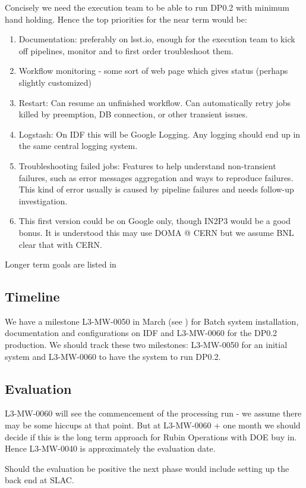 Concisely we need the execution team to be able to run DP0.2 with minimum hand holding.
Hence the top priorities for the near term would be:
\begin{enumerate}
\item Documentation: preferably on lsst.io, enough for the execution team to kick off pipelines,  monitor and to first order troubleshoot them.
\item Workflow monitoring - some sort of web page which gives status (perhaps slightly customized)
\item Restart: Can resume an unfinished workflow. Can automatically retry jobs killed by preemption, DB connection, or other transient issues.
\item Logstash: On IDF this will be Google Logging. Any logging should end up in the same central logging system.
\item Troubleshooting failed jobs: Features to help understand non-transient failures, such as error messages aggregation and ways to reproduce failures. This kind of error usually is caused by pipeline failures and needs follow-up investigation.
\item This first version could be on Google only, though IN2P3 would be a good bonus.  It is understood this may use DOMA @ CERN but we assume BNL clear that with CERN.
\end{enumerate}

Longer term goals are listed in 

\subsection{Timeline}
We have a milestone L3-MW-0050 in March (see ) for Batch system installation, documentation and configurations on IDF and L3-MW-0060 for the DP0.2 production.
We should track these two milestones: L3-MW-0050 for an initial system and L3-MW-0060 to
have the system to run DP0.2.

\subsection{Evaluation}
L3-MW-0060 will see the commencement of the processing run - we assume there may be some
hiccups  at that point. But at L3-MW-0060 + one month we should decide if this is the long term approach for Rubin Operations with DOE buy in.
Hence L3-MW-0040 is approximately the evaluation date.

Should the evaluation be positive the next phase would include setting up the back end at SLAC.


